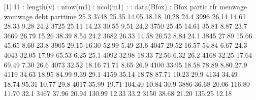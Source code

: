 \documentclass[a4paper,12pt]{article}
\begin{document}
{{[1] 11
\newline
: length(v)
\newline
: nrow(m1)
\newline
: ncol(m1)
\newline
: : data(Bfox)
\newline
: Bfox
\newline
partic  tfr menwage womwage   debt parttime
   25.3 3748   25.35   14.05  18.18    10.28
   24.4 3996   26.14   14.61  28.33     9.28
   24.2 3725   25.11   14.23  30.55     9.51
   24.2 3750   25.45   14.61  35.81     8.87
   23.7 3669   26.79   15.26  38.39     8.54
   24.2 3682   26.33   14.58  26.52     8.84
   24.1 3845   27.89   15.66  45.65     8.60
   23.8 3905   29.15   16.30  52.99     5.49
   23.6 4047   29.52   16.57  54.84     6.67
   24.3 4043   32.05   17.99  65.53     6.25
   25.1 4092   32.98   18.33  72.56     6.32
   26.2 4168   32.25   17.64  69.49     7.30
   26.6 4073   32.52   18.16  71.71     8.65
   26.9 4100   33.95   18.58  78.89     8.80
   27.9 4119   34.63   18.95  84.99     9.39
   29.1 4159   35.14   18.78  87.71    10.23
   29.9 4134   34.49   18.74  95.31    10.77
   29.8 4017   35.99   19.71 104.40    10.84
   30.9 3886   36.68   20.06 116.80    11.70
   32.1 3467   37.96   20.94 130.99    12.33
   33.2 3150   38.68   21.20 135.25    12.18
}}
\end{document}
